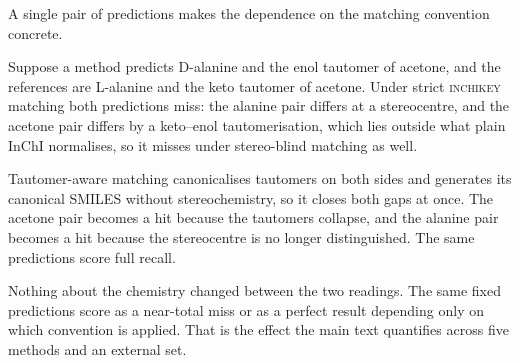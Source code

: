 A single pair of predictions makes the dependence on the matching convention concrete.

Suppose a method predicts D-alanine and the enol tautomer of acetone, and the references are
L-alanine and the keto tautomer of acetone. Under strict \textsc{inchikey} matching both
predictions miss: the alanine pair differs at a stereocentre, and the acetone pair differs by a
keto--enol tautomerisation, which lies outside what plain InChI normalises, so it misses under
stereo-blind matching as well.

Tautomer-aware matching canonicalises tautomers on both sides and generates its canonical SMILES
without stereochemistry, so it closes both gaps at once. The acetone pair becomes a hit because
the tautomers collapse, and the alanine pair becomes a hit because the stereocentre is no longer
distinguished. The same predictions score full recall.

Nothing about the chemistry changed between the two readings. The same fixed predictions score as
a near-total miss or as a perfect result depending only on which convention is applied. That is the
effect the main text quantifies across five methods and an external set.
